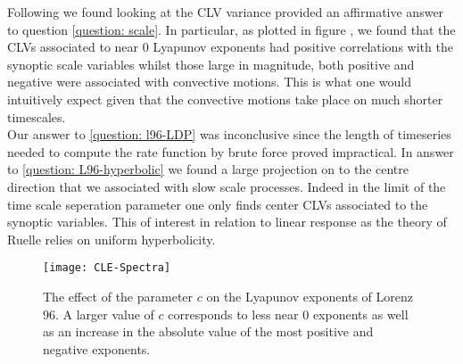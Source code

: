 Following \cite{Vannitsem2016} we found looking at the CLV variance provided an affirmative answer to question \ref{question: scale}. In particular, as plotted in figure \label{fig:c-effect-CLE}, we found that the CLVs associated to near $0$ Lyapunov exponents had positive correlations with the synoptic scale variables whilst those large in magnitude, both positive and negative were associated with convective motions. This is what one would intuitively expect given that the convective motions take place on much shorter timescales.\\

Our answer to \ref{question: l96-LDP} was inconclusive since the length of timeseries needed to compute the rate function by brute force proved impractical. In answer to \ref{question: L96-hyperbolic} we found a large projection on to the centre direction that we associated with slow scale processes. Indeed in the limit of the time scale seperation parameter one only finds center CLVs associated to the synoptic variables. This of interest in relation to linear response as the theory of Ruelle relies on uniform hyperbolicity.



\begin{figure}
\centering
\texttt{[image: CLE-Spectra]}
\caption{The effect of the parameter $c$ on the Lyapunov exponents of Lorenz $96$. A larger value of $c$ corresponds to less near $0$ exponents as well as an increase in the absolute value of the most positive and negative exponents.}
\label{fig:c-effect-CLE}
\end{figure}

